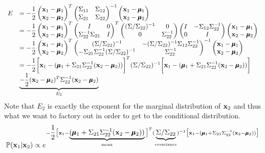 \documentclass[11pt,a4paper]{article}
\begin{document}
\[\begin{array}{rl}
E&=-\dfrac{1}{2}\begin{pmatrix}
\textbf{x}_1-\pmb{\mu}_1\\\textbf{x}_2-\pmb{\mu}_2
\end{pmatrix}^T\begin{pmatrix}
\Sigma_{11}&\Sigma_{12}\\
\Sigma_{21}&\Sigma_{22}
\end{pmatrix}^{-1}\begin{pmatrix}
\textbf{x}_1-\pmb{\mu}_1\\\textbf{x}_2-\pmb{\mu}_2
\end{pmatrix}\\
&=-\dfrac{1}{2}\begin{pmatrix}
\textbf{x}_1-\pmb{\mu}_1\\
\textbf{x}_2-\pmb{\mu}_2
\end{pmatrix}^T
\begin{pmatrix}
I&0\\
\Sigma_{22}^{-1}\Sigma_{21}&I
\end{pmatrix}^T
\begin{pmatrix}
(\Sigma/\Sigma_{22})^{-1}&0\\
0&\Sigma_{22}^{-1}
\end{pmatrix}
\begin{pmatrix}
I&-\Sigma_{12}\Sigma_{22}^{-1}\\
0&I
\end{pmatrix}
\begin{pmatrix}
\textbf{x}_1-\pmb{\mu}_1\\
\textbf{x}_2-\pmb{\mu}_2
\end{pmatrix}\\
&=-\dfrac{1}{2}\begin{pmatrix}
\textbf{x}_1-\pmb{\mu}_1\\
\textbf{x}_2-\pmb{\mu}_2
\end{pmatrix}^T
\begin{pmatrix}
(\Sigma/\Sigma_{22})^{-1}&-(\Sigma/\Sigma_{22})^{-1}\Sigma_{12}\Sigma_{22}^{-1}\\
-\Sigma_{21}\Sigma_{22}^{-1}(\Sigma/\Sigma_{22})^{-1}&\Sigma_{22}^{-1}
\end{pmatrix}^{-1}
\begin{pmatrix}
\textbf{x}_1-\pmb{\mu}_1\\
\textbf{x}_2-\pmb{\mu}_2
\end{pmatrix}\\
&=-\dfrac{1}{2}\bigg[\textbf{x}_1-(\pmb{\mu}_1+\Sigma_{21}\Sigma_{22}^{-1}(\textbf{x}_2-\pmb{\mu}_2))\bigg]^T(\Sigma/\Sigma_{22})^{-1}\bigg[\textbf{x}_1-(\pmb{\mu}_1+\Sigma_{21}\Sigma_{22}^{-1}(\textbf{x}_2-\pmb{\mu}_2))\bigg]\\
&\underbrace{-\dfrac{1}{2}(\textbf{x}_2-\pmb{\mu}_2)^T\Sigma_{22}^{-1}(\textbf{x}_2-\pmb{\mu}_2)}_{E_2}
\end{array}\]
Note that $E_2$ is exactly the exponent for the marginal distribution of $\textbf{x}_2$ and thus what we want to factory out in order to get to the conditional distribution.
$$\mathbb{P}(\textbf{x}_1|\textbf{x}_2)\propto e^{-\dfrac{1}{2}\big[\textbf{x}_1-\underbrace{(\pmb{\mu}_1+\Sigma_{21}\Sigma_{22}^{-1}(\textbf{x}_2-\pmb{\mu}_2))}_{\text{mean}}\big]^T(\underbrace{\Sigma/\Sigma_{22}}_{\text{covariance}})^{-1}\big[\textbf{x}_1-(\pmb{\mu}_1+\Sigma_{21}\Sigma_{22}^{-1}(\textbf{x}_2-\pmb{\mu}_2))\big]}$$
\proved
\end{document}
